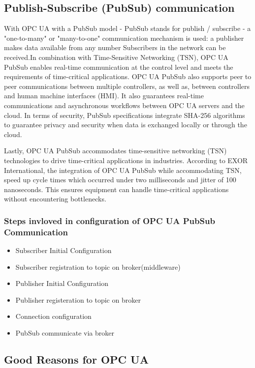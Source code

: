 \documentclass{article}
\begin{document}
			 	
	
	\subsection{Publish-Subscribe (PubSub) communication}
	With OPC UA with a PubSub model - PubSub stands for publish / subscribe - a "one-to-many" or "many-to-one" communication mechanism is used: a publisher makes data available from any number Subscribers in the network can be received.In combination with Time-Sensitive Networking (TSN), OPC UA PubSub enables real-time communication at the control level and meets the requirements of time-critical applications.
	OPC UA PubSub also supports peer to peer communications between multiple controllers, as well as, between controllers and human machine interfaces (HMI). It also guarantees real-time communications and asynchronous workflows between OPC UA servers and the cloud. In terms of security, PubSub specifications integrate SHA-256 algorithms to guarantee privacy and security when data is exchanged locally or through the cloud.

Lastly, OPC UA PubSub accommodates time-sensitive networking (TSN) technologies to drive time-critical applications in industries. According to EXOR International, the integration of OPC UA PubSub while accommodating TSN, speed up cycle times which occurred under two milliseconds and jitter of 100 nanoseconds. This ensures equipment can handle time-critical applications without encountering bottlenecks.
	 \\
	 \subsubsection{Steps invloved in configuration of OPC UA PubSub Communication}
	\begin{itemize}
	\item Subscriber Initial Configuration
	\item Subscriber registration to topic on broker(middleware)
	\item Publisher Initial Configuration
	\item Publisher registeration to topic on broker
	\item Connection configuration
	\item PubSub communicate via broker
	 \end{itemize}	
	 	
	
	 	
	\subsection{Good Reasons for OPC UA}
\end{document}
